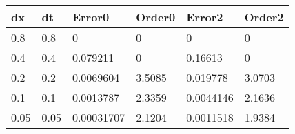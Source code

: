 \begin{tabular}{llllll}
dx & dt & Error0 & Order0 & Error2 & Order2 \\ 
\hline 
0.8 & 0.8 & 0 & 0 & 0 & 0 \\ 
0.4 & 0.4 & 0.079211 & 0 & 0.16613 & 0 \\ 
0.2 & 0.2 & 0.0069604 & 3.5085 & 0.019778 & 3.0703 \\ 
0.1 & 0.1 & 0.0013787 & 2.3359 & 0.0044146 & 2.1636 \\ 
0.05 & 0.05 & 0.00031707 & 2.1204 & 0.0011518 & 1.9384 \\ 
\hline 
\end{tabular}